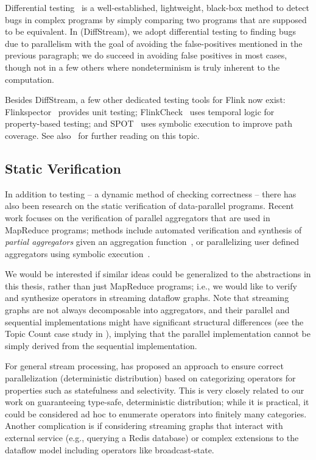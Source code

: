 Differential testing~\cite{mckeeman1998differential,groce2007randomized} is a well-established, lightweight, black-box method to detect bugs in complex programs by simply comparing two programs that are supposed to be equivalent.
In  (DiffStream), we adopt differential testing to finding bugs due to parallelism with the goal of avoiding the false-positives mentioned in the previous paragraph; we do succeed in avoiding false positives in most cases, though not in a few others where nondeterminism is truly inherent to the computation.

Besides DiffStream, a few other dedicated testing tools for Flink now exist:
Flinkspector~\cite{flinkspector} provides unit testing;
FlinkCheck~\cite{espinosa2019flinkcheck} uses temporal logic for property-based testing; and SPOT~\cite{ye2021spot} uses symbolic execution to improve path coverage.
See also~\cite{joachim2018methodology} for further reading on this topic.

\subsection{Static Verification}

In addition to testing -- a dynamic method of checking
correctness -- there has also been research on the static verification
of data-parallel programs. Recent work focuses on the verification of
parallel aggregators that are used in MapReduce programs; methods include automated verification and synthesis of \emph{partial
aggregators} given an aggregation function~\cite{liu2014automating},
or parallelizing user defined aggregators using symbolic
execution~\cite{raychev2015parallelizing}.

We would be interested if similar ideas could be generalized to the abstractions in this thesis,
rather than just MapReduce programs;
i.e., we would like to verify and synthesize operators in streaming dataflow graphs.
Note that streaming graphs are not always decomposable into aggregators, and their parallel
and sequential implementations might have significant structural
differences (see the Topic Count case study in
), implying that the parallel implementation cannot be simply
derived from the sequential implementation.

For general stream processing, \cite{schneider2013safe} has proposed an approach to ensure correct parallelization (deterministic distribution) based on categorizing operators for properties such as statefulness and selectivity.
This is very closely related to our work on guaranteeing type-safe, deterministic distribution;
while it is practical, it could be considered ad hoc to enumerate operators into finitely many categories.
Another complication is if considering streaming graphs that interact with external service (e.g., querying a Redis database) or complex extensions to the dataflow model including operators like broadcast-state.

